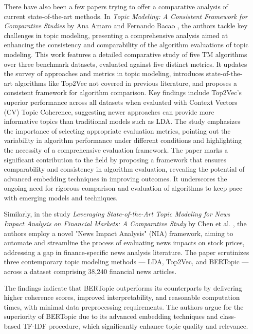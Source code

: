 \documentclass[fleqn,moreauthors,10pt]{ds_report}
\begin{document}
There have also been a few papers trying to offer a comparative analysis of current state-of-the-art methods. In \textit{Topic Modeling: A Consistent Framework for Comparative Studies} by Ana Amaro and Fernando Bacao \cite{Amaro2024TopicMA}, the authors tackle key challenges in topic modeling, presenting a comprehensive analysis aimed at enhancing the consistency and comparability of the algorithm evaluations of topic modeling. This work features a detailed comparative study of five TM algorithms over three benchmark datasets, evaluated against five distinct metrics. It updates the survey of approaches and metrics in topic modeling, introduces state-of-the-art algorithms like Top2Vec not covered in previous literature, and proposes a consistent framework for algorithm comparison.
Key findings include Top2Vec's superior performance across all datasets when evaluated with Context Vectors (CV) Topic Coherence, suggesting newer approaches can provide more informative topics than traditional models such as LDA. The study emphasizes the importance of selecting appropriate evaluation metrics, pointing out the variability in algorithm performance under different conditions and highlighting the necessity of a comprehensive evaluation framework.
The paper marks a significant contribution to the field by proposing a framework that ensures comparability and consistency in algorithm evaluation, revealing the potential of advanced embedding techniques in improving outcomes. It underscores the ongoing need for rigorous comparison and evaluation of algorithms to keep pace with emerging models and techniques.

Similarly, in the study \textit{Leveraging State-of-the-Art Topic Modeling for News Impact Analysis on Financial Markets: A Comparative Study} by Chen et al. \cite{NIAframework}, the authors employ a novel "News Impact Analysis" (NIA) framework, aiming to automate and streamline the process of evaluating news impacts on stock prices, addressing a gap in finance-specific news analysis literature. The paper scrutinizes three contemporary topic modeling methods — LDA, Top2Vec, and BERTopic — across a dataset comprising 38,240 financial news articles. 

The findings indicate that BERTopic outperforms its counterparts by delivering higher coherence scores, improved interpretability, and reasonable computation times, with minimal data preprocessing requirements. The authors argue for the superiority of BERTopic due to its advanced embedding techniques and class-based TF-IDF procedure, which significantly enhance topic quality and relevance.
\end{document}
